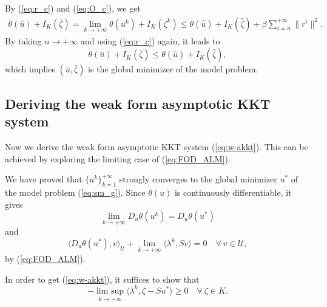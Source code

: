 \documentclass[leqno]{amsart}
\DeclareMathOperator*\uplim{lim\ sup}
\theoremstyle{definition}
\begin{document}
By (\ref{eq:r_c}) and (\ref{eq:O_c}), we get
\begin{equation}\nonumber
\begin{aligned}
 \theta(\bar{u}) + I_K(\bar{\zeta}) = \lim\limits_{k\rightarrow+\infty}\theta(u^k) + I_K(\zeta^k) \leq \theta(\hat{u}) + I_K(\hat{\zeta}) + \beta\sum\limits_{i = n}^{+\infty}\|r^{i}\|^2.
\end{aligned}
\end{equation}
By taking $n\rightarrow + \infty$ and using (\ref{eq:r_c}) again, it leads to
\begin{equation}\nonumber
\theta(\bar{u}) + I_K(\bar{\zeta}) \leq \theta(\hat{u}) + I_K(\hat{\zeta}),
\end{equation}
which implies $(\bar{u},\bar{\zeta})$ is the global minimizer of the model problem.

\subsection{Deriving the weak form asymptotic KKT system} Now we derive the weak form asymptotic KKT system (\ref{eq:w-akkt}). This can be achieved by exploring the limiting case of (\ref{eq:FOD_ALM}).

We have proved that $\{u^k\}_{k=1}^{+\infty}$ strongly converges to the global minimizer $u^*$ of the model problem (\ref{eq:sm_g}). Since $\theta(u)$ is continuously differentiable, it gives
$$ \lim\limits_{k\rightarrow +\infty} D_u\theta(u^k) = D_u\theta(u^*)$$
and
\begin{equation}\label{eq:w-akkt1}
\langle D_u\theta(u^*), v\rangle_\mathcal{U}  + \lim\limits_{k\rightarrow +\infty}\langle \lambda^{k}, Sv\rangle = 0\quad \forall\ v\in \mathcal{U},
\end{equation}
by (\ref{eq:FOD_ALM}).

In order to get (\ref{eq:w-akkt}), it suffices to show that
$$-\uplim\limits_{k\rightarrow + \infty}\langle \lambda^k, \zeta - Su^*\rangle \geq 0\quad \forall\ \zeta\in K.$$
\end{document}
